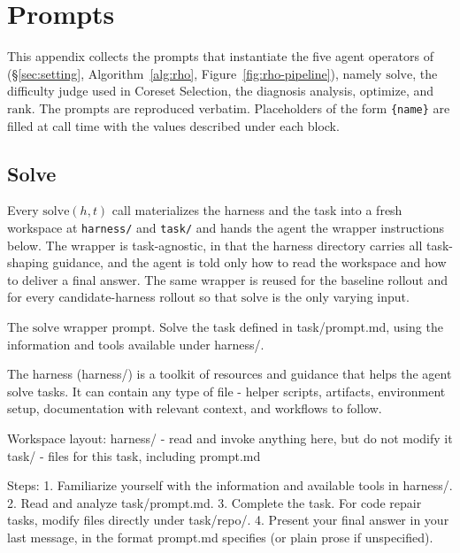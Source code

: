 \section{Prompts}\label{app:prompts}

This appendix collects the prompts that instantiate the five agent
operators of \method{} (\S\ref{sec:setting}, Algorithm~\ref{alg:rho},
Figure~\ref{fig:rho-pipeline}), namely $\mathrm{solve}$, the difficulty judge
used in Coreset Selection, the diagnosis analysis, $\mathrm{optimize}$,
and $\mathrm{rank}$. The prompts are reproduced verbatim. Placeholders
of the form \texttt{\{name\}} are filled at call time with the values
described under each block.

\subsection{Solve}

Every $\mathrm{solve}(h, t)$ call materializes the harness and the
task into a fresh workspace at \texttt{harness/} and \texttt{task/} and
hands the agent the wrapper instructions below. The wrapper is
task-agnostic, in that the harness directory carries all task-shaping
guidance, and the agent is told only how to read the workspace and how
to deliver a final answer. The same wrapper is reused for the
baseline rollout and for every candidate-harness rollout so that
$\mathrm{solve}$ is the only varying input.

\begin{promptbox}{The $\mathrm{solve}$ wrapper prompt.}
Solve the task defined in task/prompt.md, using the information and tools available under harness/.

The harness (harness/) is a toolkit of resources and guidance that helps the agent solve tasks. It can contain any type of file - helper scripts, artifacts, environment setup, documentation with relevant context, and workflows to follow.

Workspace layout:
  harness/   - read and invoke anything here, but do not modify it
  task/      - files for this task, including prompt.md

Steps:
1. Familiarize yourself with the information and available tools in harness/.
2. Read and analyze task/prompt.md.
3. Complete the task. For code repair tasks, modify files directly under task/repo/.
4. Present your final answer in your last message, in the format prompt.md specifies (or plain prose if unspecified).
\end{promptbox}

